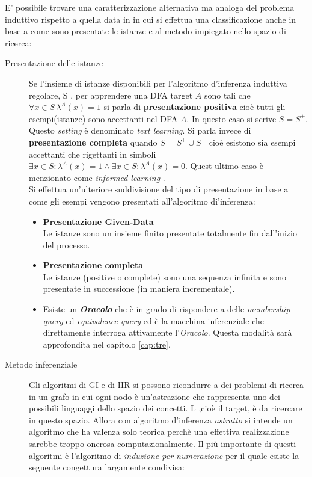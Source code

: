 E' possibile trovare una caratterizzazione alternativa ma analoga del problema induttivo rispetto a quella data in \cite{Angluin83} in cui si effettua una classificazione anche in base a come sono presentate le istanze e al metodo impiegato nello spazio di ricerca:
\begin{description}
\item[Presentazione delle istanze]Se l'insieme di istanze disponibili per l'algoritmo d'inferenza induttiva regolare, S , per apprendere una \ac{DFA}  target $A$ sono tali che $\forall x \in S \,\lambda^{A}(x) = 1$ si parla di \textbf{presentazione positiva} cioè tutti gli esempi(istanze) sono accettanti nel \ac{DFA} $A$. In questo caso si scrive $S=S^{+}$. Questo \textit{setting} è  denominato \textit{text learning}\cite[p. 217]{DeLaHiguera10}. Si parla invece di \textbf{presentazione completa} quando $S=S^{+} \cup S^{-}$ cioè esistono sia esempi accettanti che rigettanti in simboli $\exists x \in S :   \lambda^{A}(x)=1 \land \exists x \in S :   \lambda^{A}(x)=0$. Quest ultimo caso è menzionato come \textit{informed learning} \cite[p. 237]{DeLaHiguera10} .\\

Si effettua un'ulteriore suddivisione del tipo di presentazione in base a come gli esempi vengono presentati all'algoritmo di'inferenza:
\begin{itemize}
\item \textbf{Presentazione Given-Data}\\Le istanze sono un insieme finito presentate totalmente fin dall'inizio del processo.
\item \textbf{Presentazione completa}\\Le istanze (positive o complete) sono una sequenza infinita e sono presentate in successione (in maniera incrementale).  
\item Esiste un \textbf{\textit{Oracolo}} che è in grado di rispondere a delle \textit{membership query} ed \textit{equivalence query} ed è la macchina inferenziale che direttamente interroga attivamente l'\textit{Oracolo}. Questa modalità sarà approfondita nel capitolo \ref{cap:tre}.
\end{itemize}
\item[Metodo inferenziale]Gli algoritmi di \ac{GI} e di \ac{IIR} si possono ricondurre a dei problemi di ricerca in un grafo in cui ogni nodo è un'astrazione che rappresenta uno dei possibili linguaggi dello spazio dei concetti. \ac{L} ,cioè il target, è da ricercare in questo spazio.  Allora con algoritmo d'inferenza \textit{astratto} si intende un algoritmo che ha valenza solo teorica perchè una effettiva realizzazione sarebbe troppo onerosa computazionalmente. Il più importante di questi algoritmi è l'algoritmo di \textit{induzione per numerazione} per il quale esiste la seguente congettura largamente condivisa:


\end{description}
